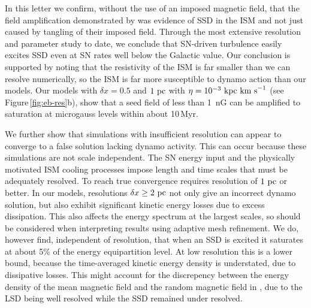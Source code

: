 \documentclass[preprint2]{aastex63}
\newcommand\kpc{~ {\rm kpc}}
\newcommand\pc{~ {\rm pc}}
\newcommand\dx{ {\delta x}}
\newcommand\kms{~ {\rm km~ s}^{-1}}
\begin{document}
In this letter we confirm, without the use of an imposed magnetic field, that
the field amplification demonstrated by \citet{BKMM04} was evidence of SSD in
the ISM and not just caused by tangling of their imposed field.
Through the most extensive resolution and parameter study to date, we conclude
that SN-driven turbulence easily excites SSD even at SN rates well below the
Galactic value.
Our conclusion is supported by noting that the resistivity of the ISM is far
smaller than we can resolve numerically, so the ISM is far more susceptible to
dynamo action than our models.
Our models with $\dx=0.5$ and $1\pc$ with $\eta=10^{-3}\kpc\kms$ (see
Figure\,\ref{fig:eb-res}b), show that a seed field of less than 1~nG can be
amplified to saturation at microgauss levels within about 10\,Myr.

We further show that simulations with insufficient resolution can appear to
converge to a false solution lacking dynamo activity. This can occur because
these simulations are not scale independent.
The SN energy input and the physically motivated ISM cooling processes impose
length and time scales that must be adequately resolved.
To reach true convergence requires resolution of $1\pc$ or better.
In our models, resolutions $\dx\geq2\pc$ not only give an incorrect dynamo
solution, but also exhibit significant kinetic energy losses due to excess
dissipation.
This also affects the energy spectrum at the largest scales, so should be 
considered when interpreting results using adaptive mesh refinement.
%
We do, however find, independent of resolution, that when an SSD is excited it
saturates at about 5\% of the energy equipartition level.
At low resolution this is a lower bound, because the time-averaged kinetic
energy density is understated, due to dissipative losses.
This might account for the discrepency between the energy density of the mean
magnetic field and the random magnetic field in \citet{Gent:2013b}, due to the
LSD being well resolved while the SSD remained under resolved.
\end{document}
